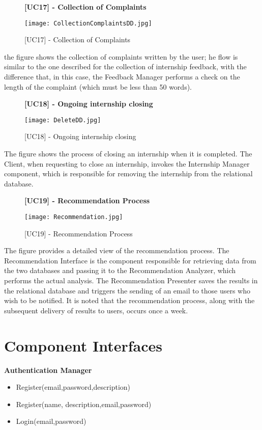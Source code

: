 		
		
		
		\begin{figure}[H]
			\centering
			{\bfseries [UC17] - Collection of Complaints}
			\caption{[UC17] - Collection of Complaints}
			\texttt{[image: CollectionComplaintsDD.jpg]}
			
		\end{figure}
		
		the figure shows the collection of complaints written by the user; he flow is similar to the one described for the collection of internship feedback, with the difference that, in this case, the Feedback Manager performs a check on the length of the complaint (which must be less than 50 words).
		
		
		\begin{figure}[H]
			\centering
			{\bfseries [UC18] - Ongoing internship closing}
			\caption{[UC18] - Ongoing internship closing}
			\texttt{[image: DeleteDD.jpg]}
			
		\end{figure}
		
		
		The figure shows the process of closing an internship when it is completed. The Client, when requesting to close an internship, invokes the Internship Manager component, which is responsible for removing the internship from the relational database.
		
		
		\begin{figure}[H]
			\centering
			{\bfseries [UC19] - Recommendation Process}
			\caption{[UC19] - Recommendation Process}
			\texttt{[image: Recommendation.jpg]}
			
		\end{figure}
		
		The figure provides a detailed view of the recommendation process. The Recommendation Interface is the component responsible for retrieving data from the two databases and passing it to the Recommendation Analyzer, which performs the actual analysis. The Recommendation Presenter saves the results in the relational database and triggers the sending of an email to those users who wish to be notified. It is noted that the recommendation process, along with the subsequent delivery of results to users, occurs once a week.
		
		\section{Component Interfaces}
		
		\textbf{Authentication Manager}
		\begin{itemize}
			\item Register(email,password,description)
			\item Register(name, description,email,password)
			\item Login(email,password)
		\end{itemize}
		
